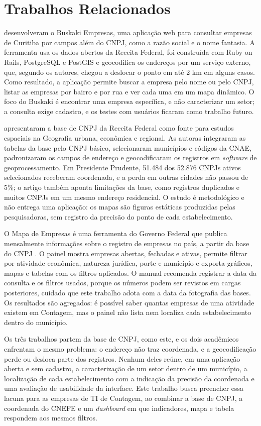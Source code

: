 \section{Trabalhos Relacionados}

 desenvolveram o Buskaki Empresas, uma aplicação web para consultar empresas de Curitiba por campos além do CNPJ, como a razão social e o nome fantasia.
A ferramenta usa os dados abertos da Receita Federal, foi construída com Ruby on Rails, PostgreSQL e PostGIS e geocodifica os endereços por um serviço externo, que, segundo os autores, chegou a deslocar o ponto em até 2 km em alguns casos.
Como resultado, a aplicação permite buscar a empresa pelo nome ou pelo CNPJ, listar as empresas por bairro e por rua e ver cada uma em um mapa dinâmico.
O foco do Buskaki é encontrar uma empresa específica, e não caracterizar um setor; a consulta exige cadastro, e os testes com usuários ficaram como trabalho futuro.

 apresentaram a base de CNPJ da Receita Federal como fonte para estudos espaciais na Geografia urbana, econômica e regional.
As autoras integraram as tabelas da base pelo CNPJ básico, selecionaram municípios e códigos da CNAE, padronizaram os campos de endereço e geocodificaram os registros em \textit{software} de geoprocessamento.
Em Presidente Prudente, 51.484 dos 52.876 CNPJs ativos selecionados receberam coordenada, e a perda em outras cidades não passou de 5\%; o artigo também aponta limitações da base, como registros duplicados e muitos CNPJs em um mesmo endereço residencial.
O estudo é metodológico e não entrega uma aplicação: os mapas são figuras estáticas produzidas pelas pesquisadoras, sem registro da precisão do ponto de cada estabelecimento.

O Mapa de Empresas é uma ferramenta do Governo Federal que publica mensalmente informações sobre o registro de empresas no país, a partir da base do CNPJ \cite{brasil2026}.
O painel mostra empresas abertas, fechadas e ativas, permite filtrar por atividade econômica, natureza jurídica, porte e município e exporta gráficos, mapas e tabelas com os filtros aplicados.
O manual recomenda registrar a data da consulta e os filtros usados, porque os números podem ser revistos em cargas posteriores, cuidado que este trabalho adota com a data da fotografia das bases.
Os resultados são agregados: é possível saber quantas empresas de uma atividade existem em Contagem, mas o painel não lista nem localiza cada estabelecimento dentro do município.

Os três trabalhos partem da base de CNPJ, como este, e os dois acadêmicos enfrentam o mesmo problema: o endereço não traz coordenada, e a geocodificação perde ou desloca parte dos registros.
Nenhum deles reúne, em uma aplicação aberta e sem cadastro, a caracterização de um setor dentro de um município, a localização de cada estabelecimento com a indicação da precisão da coordenada e uma avaliação de usabilidade da interface.
Este trabalho busca preencher essa lacuna para as empresas de TI de Contagem, ao combinar a base de CNPJ, a coordenada do CNEFE e um \textit{dashboard} em que indicadores, mapa e tabela respondem aos mesmos filtros.
